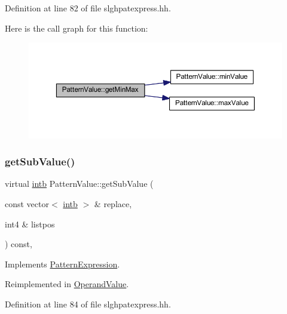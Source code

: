 Definition at line 82 of file slghpatexpress.\+hh.

Here is the call graph for this function\+:
\nopagebreak
\begin{figure}[H]
\begin{center}
\leavevmode
\includegraphics[width=350pt]{class_pattern_value_add81554f00ea23c27314f7699ef2b5f3_cgraph}
\end{center}
\end{figure}
\mbox{\label{class_pattern_value_a2c441de78d7241fc841c4223efe1b8bc}} 
\subsubsection{\texorpdfstring{getSubValue()}{getSubValue()}}
{\footnotesize\ttfamily virtual \mbox{\hyperlink{types_8h_aa925ba3e627c2df89d5b1cfe84fb8572}{intb}} Pattern\+Value\+::get\+Sub\+Value (\begin{DoxyParamCaption}\item[{const vector$<$ \mbox{\hyperlink{types_8h_aa925ba3e627c2df89d5b1cfe84fb8572}{intb}} $>$ \&}]{replace,  }\item[{int4 \&}]{listpos }\end{DoxyParamCaption}) const\hspace{0.3cm}{\ttfamily [inline]}, {\ttfamily [virtual]}}



Implements \mbox{\hyperlink{class_pattern_expression_ade37db4aa76dd442b189bf4a6bb2d9dd}{Pattern\+Expression}}.



Reimplemented in \mbox{\hyperlink{class_operand_value_a76d6f76e74edfb71ce1cd126c44a3788}{Operand\+Value}}.



Definition at line 84 of file slghpatexpress.\+hh.

\mbox{\label{class_pattern_value_abb0724c0454f8ed78f9082cde5a8077d}} 
